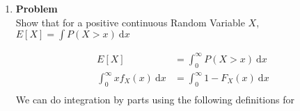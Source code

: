 \documentclass[12pt]{article}
\newenvironment{Ex}{\textbf{Problem}\vspace{.75em}\\}{}
\newcommand{\dd}[1]{\:\mathrm{d}{#1}}
\begin{document}
\begin{enumerate}
\begin{Ex}
\begin{solution}
\begin{enumerate}
        \begin{equation}
          \label{eq:6c-sol}
          \begin{aligned}
            P(X<Y<2) &= \int_0^2\int_0^yf_X(x)f_Y(y)\dd{x}\dd{y} \\
            &=\int_0^2\int_0^y6e^{-(2x+3y)}\dd{x}\dd{y} \\
            &= 3\int_0^2 e^{-3y} - e^{-5y} \dd{y} \\
            \implies P(X<Y<2) &= 0.3976
          \end{aligned}
        \end{equation}
      \item The equation is as follows
        \begin{equation}
          \label{eq:6d-sol}
          P(X\le Y^2) = \int_0^\infty\int_{0}^{y^2}
          f_X(x)f_Y(y)\dd{x}\dd{y}
        \end{equation}
      \item $E[X +Y]$ can be computed as follows
        \begin{equation}
          \label{eq:6e-sol}
          \begin{aligned}
            E[X +Y] &= E[X] + E[Y] \\
            &= \int_0^\infty x \cdot f_X(x) \dd{x} + \int_0^\infty y
            \cdot f_Y(y) \dd{y} \\
            \implies E[X +Y] &= \frac{5}{6}
          \end{aligned}
        \end{equation}
      \end{enumerate}
    \end{solution}
  \end{Ex}
\item
  \begin{Ex}
    Show that for a positive continuous Random Variable $X$, $E[X] =
    \int P(X > x) \dd{x}$
    \begin{solution} \hfill
      \begin{equation}
        \begin{aligned}
          \label{eq:7-sol}
          E[X] &= \int_{0}^{\infty} P(X > x) \dd{x} \\
          \int_{0}^{\infty} x f_X(x) \dd{x} &=
          \int_{0}^{\infty} 1 - F_X(x) \dd{x} \\
        \end{aligned}
      \end{equation}
      We can do integration by parts using the following definitions for

\end{solution}
\end{Ex}
\end{enumerate}
\end{document}
